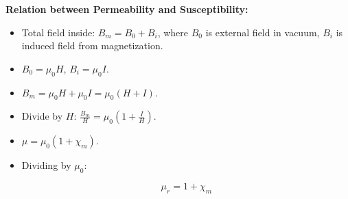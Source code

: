 \begin{frame}[t]
      \item<+-> \textbf{Relation between Permeability and Susceptibility:}
        \begin{itemize}[<+->]
              \item Total field inside: $B_m = B_0 + B_i$, where $B_0$ is external field in vacuum, $B_i$ is induced field from magnetization.
              \item $B_0 = \mu_0 H$, $B_i = \mu_0 I$.
              \item $B_m = \mu_0 H + \mu_0 I = \mu_0 (H + I)$.
              \item Divide by $H$: $\frac{B_m}{H} = \mu_0 (1 + \frac{I}{H})$.
              \item $\mu = \mu_0 (1 + \chi_m)$.
            \item Dividing by $\mu_0$:
            \begin{tcolorbox}[colback=orange!8,colframe=accentorange,boxrule=0.5pt,arc=1mm,boxsep=2pt]
            \begin{equation*}
                 \mu_r = 1 + \chi_m
            \end{equation*}
              \end{tcolorbox}
        \end{itemize}
\end{frame}

\transfade[duration=0.5]

